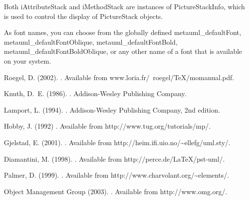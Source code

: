 \documentclass{article}
\newcommand{\code}{\ttfamily}
\begin{document}
\begin{verbatim}
\end{verbatim}

Both {\code iAttributeStack} and {\code iMethodStack} are instances of
{\code PictureStackInfo}, which is used to control the display of {\code PictureStack} objects.

As font names, you can choose from the globally defined {\code metauml\_defaultFont}, {\code metauml\_defaultFontOblique}, {\code metauml\_defaultFontBold}, {\code metauml\_defaultFontBoldOblique}, or any other name of a font that is available on your system.




\begin{thebibliography}{1}
Roegel, D. (2002).
.
\newblock Available from {\code www.loria.fr/~roegel/TeX/momanual.pdf}.

Knuth, D.~E. (1986).
.
\newblock Addison-Wesley Publishing Company.

Lamport, L. (1994).
.
\newblock Addison-Wesley Publishing Company, 2nd edition.

Hobby, J. (1992)
.
\newblock Available from {\code http://www.tug.org/tutorials/mp/}.

Gjelstad, E. (2001).
.
\newblock Available from {\code http://heim.ifi.uio.no/\~{ }ellefg/uml.sty/}.

Diamantini, M. (1998).
.
\newblock Available from {\code http://perce.de/LaTeX/pst-uml/}.

Palmer, D. (1999).
.
\newblock Available from {\code http://www.charvolant.org/\~{ }elements/}.

Object Management Group (2003).
.
\newblock Available from {\code http://www.omg.org/}.
\end{thebibliography}

\pagebreak

\end{document}
